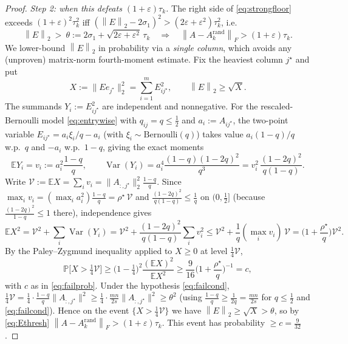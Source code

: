 \documentclass{amsart}
\theoremstyle{definition}
\DeclareMathOperator{\Var}{Var}
\newcommand{\Frob}[1]{\left\lVert #1\right\rVert_F}
\newcommand{\Op}[1]{\left\lVert #1\right\rVert_2}
\newcommand{\E}{\mathbb{E}}
\newcommand{\Prob}{\mathbb{P}}
\begin{document}
\begin{proof}
\emph{Step 2: when this defeats $(1+\varepsilon)\tau_k$.} The right side of
\eqref{eq:strongfloor} exceeds $(1+\varepsilon)^2\tau_k^2$ iff
$(\Op E-2\sigma_1)^2>(2\varepsilon+\varepsilon^2)\tau_k^2$, i.e.\
\begin{equation}\label{eq:Ethresh}
\Op E\ >\ \theta:=2\sigma_1+\sqrt{2\varepsilon+\varepsilon^2}\,\tau_k
\quad\Longrightarrow\quad
\Frob{A-A_k^{\mathrm{rand}}}>(1+\varepsilon)\tau_k .
\end{equation}
We lower-bound $\Op E$ in probability via a \emph{single column}, which avoids
any (unproven) matrix-norm fourth-moment estimate. Fix the heaviest column
$j^\star$ and put
\[
X:=\|Ee_{j^\star}\|_2^2=\sum_{i=1}^m E_{ij^\star}^2,\qquad \Op E\ge\sqrt X .
\]
The summands $Y_i:=E_{ij^\star}^2$ are independent and nonnegative. For the
rescaled-Bernoulli model \eqref{eq:entrywise} with $q_{ij}=q\le\tfrac12$ and
$a_i:=A_{ij^\star}$, the two-point variable $E_{ij^\star}=a_i\xi_i/q-a_i$ (with
$\xi_i\sim\mathrm{Bernoulli}(q)$) takes value $a_i(1-q)/q$ w.p.\ $q$ and $-a_i$
w.p.\ $1-q$, giving the exact moments
\begin{equation}\label{eq:moments}
\E Y_i=v_i:=a_i^2\frac{1-q}{q},\qquad
\Var(Y_i)=a_i^4\frac{(1-q)(1-2q)^2}{q^3}
=v_i^2\,\frac{(1-2q)^2}{q(1-q)} .
\end{equation}
Write $\mathcal V:=\E X=\sum_i v_i=\|A_{:,j^\star}\|_2^2\frac{1-q}{q}$. Since
$\max_i v_i=(\max_i a_i^2)\frac{1-q}q=\rho^\star\,\mathcal V$ and
$\frac{(1-2q)^2}{q(1-q)}\le\frac1q$ on $(0,\tfrac12]$ (because
$\frac{(1-2q)^2}{1-q}\le1$ there), independence gives
\begin{equation}\label{eq:EX2}
\E X^2=\mathcal V^2+\sum_i\Var(Y_i)
=\mathcal V^2+\frac{(1-2q)^2}{q(1-q)}\sum_i v_i^2
\le\mathcal V^2+\frac1q(\max_i v_i)\,\mathcal V
=\Big(1+\frac{\rho^\star}{q}\Big)\mathcal V^2 .
\end{equation}
By the Paley--Zygmund inequality applied to $X\ge0$ at level $\tfrac14\mathcal V$,
\[
\Prob\!\Big[X>\tfrac14\mathcal V\Big]
\ge\Big(1-\tfrac14\Big)^2\frac{(\E X)^2}{\E X^2}
\ge\frac{9}{16}\Big(1+\frac{\rho^\star}{q}\Big)^{-1}=c ,
\]
with $c$ as in \eqref{eq:failprob}.
Under the hypothesis \eqref{eq:failcond},
$\tfrac14\mathcal V=\tfrac14\cdot\tfrac{1-q}{q}\|A_{:,j^\star}\|^2
\ge\tfrac14\cdot\tfrac{mn}{2s}\|A_{:,j^\star}\|^2\ge\theta^2$ (using
$\tfrac{1-q}q\ge\tfrac1{2q}=\tfrac{mn}{2s}$ for $q\le\tfrac12$ and
\eqref{eq:failcond}). Hence on the event $\{X>\tfrac14\mathcal V\}$ we have
$\Op E\ge\sqrt X>\theta$, so by \eqref{eq:Ethresh}
$\Frob{A-A_k^{\mathrm{rand}}}>(1+\varepsilon)\tau_k$. This event has probability
$\ge c=\tfrac9{32}$.


\end{proof}
\end{document}

